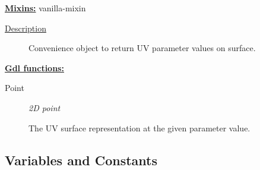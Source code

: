 \documentclass [11pt]{book}
\begin{document}
\begin{itemize}
\textbf{
\underline{Mixins:}} vanilla-mixin





\begin{description}

\item [
\underline{Description}]


Convenience object to return UV parameter values on surface.



\end{description}








\textbf{
\underline{Gdl functions:}}

\begin{description}

\item [Point]
\emph{2D point}

 The UV surface representation at the given parameter value.




\end{description}







\end{itemize}



\subsection{Variables and Constants}

\label{subsec:variablesandconstants}
\end{document}
